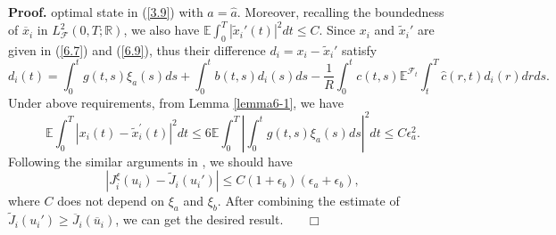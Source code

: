 \documentclass[11pt]{article}
\newenvironment{proof}[1][Proof]{\noindent \textbf{#1.} }{\ \ \  $\Box$}
\def\dbE{\mathbb{E}}
\def\dbR{\mathbb{R}}
\begin{document}
\begin{proof}
optimal state in (\ref{3.9}) with $a=\widehat{a}$. Moreover,
recalling the boundedness of $\overline{x}_i$ in
$L^2_{\mathcal{F}}(0,T;\dbR)$, we also have
$\dbE\int_{0}^{T}|\widetilde{x}_{i}'(t)|^{2}dt\leq C$.
Since $x_{i}$ and $\widetilde{x}_{i}'$ are given in
(\ref{6.7}) and (\ref{6.9}), thus their difference
$d_{i}=x_{i}-\widetilde{x}_{i}'$ satisfy
%
\[
d_{i}(t)=\int_{0}^{t}g(t,s)\xi _{a}(s)ds+\int_{0}^{t}b(t,s)d_{i}(s)ds-\frac{1}{R}\int_{0}^{t}c(t,s)\dbE^{\mathcal{F}_{t}}\!\!\int_{t}^{T}\widehat{c}(r,t)d_{i}(r)drds.
\]
%
Under above requirements, from Lemma \ref{lemma6-1}, we have
%
\[
\dbE\int_{0}^{T}|x_{i}(t)-\widetilde{x}_{i}^{\prime }(t)|^{2}dt\leq 6\dbE\int_{0}^{T}\left\vert\int_{0}^{t}g(t,s)\xi _{a}(s)ds\right\vert^{2}dt\leq C\epsilon _{a}^{2}.
\]
%
Following the similar arguments in \cite{N-H 2012}, we should have
%
\[
|J_{i}^{\xi}(u_{i})-\widetilde{J}_{i}(u_{i}')| \leq
C(1+\epsilon_b)(\epsilon _{a}+\epsilon _{b}),
\]
%
where $C$ does not depend on $\xi_a$ and $\xi_b$. After combining the
estimate of $\widetilde{J}_{i}(u_{i}')\geq
\overline{J}_i(\overline{u}_i)$, we can get the desired result.
\hfill
\end{proof}
\end{document}

